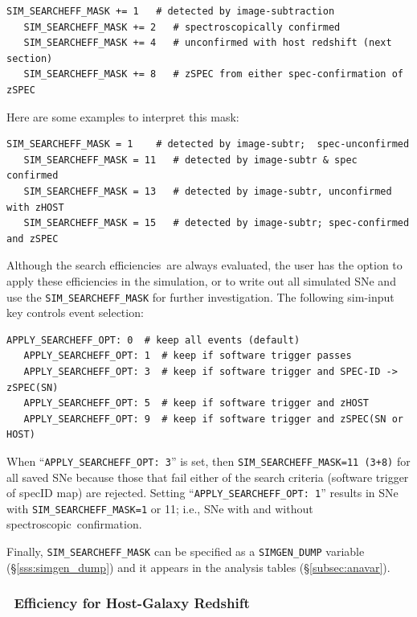 \documentclass[12pt]{article}
\newcommand{\effs}{efficiencies}
\newcommand{\spec}{spectroscopic}
\begin{document}
{%
\begin{Verbatim}[frame=single]
   SIM_SEARCHEFF_MASK += 1   # detected by image-subtraction
   SIM_SEARCHEFF_MASK += 2   # spectroscopically confirmed
   SIM_SEARCHEFF_MASK += 4   # unconfirmed with host redshift (next section)
   SIM_SEARCHEFF_MASK += 8   # zSPEC from either spec-confirmation of zSPEC
\end{Verbatim}
%
Here are some examples to interpret this mask:
%
\begin{Verbatim}[frame=single]
   SIM_SEARCHEFF_MASK = 1    # detected by image-subtr;  spec-unconfirmed
   SIM_SEARCHEFF_MASK = 11   # detected by image-subtr & spec confirmed
   SIM_SEARCHEFF_MASK = 13   # detected by image-subtr, unconfirmed with zHOST
   SIM_SEARCHEFF_MASK = 15   # detected by image-subtr; spec-confirmed and zSPEC
\end{Verbatim}
%
Although the search \effs\ are always evaluated, the user has
the option to apply these efficiencies in the simulation,
or to write out all simulated SNe and use the 
{\tt SIM\_SEARCHEFF\_MASK} for further investigation.
The following sim-input key controls event selection:
%
\begin{Verbatim}[frame=single]
   APPLY_SEARCHEFF_OPT: 0  # keep all events (default)
   APPLY_SEARCHEFF_OPT: 1  # keep if software trigger passes
   APPLY_SEARCHEFF_OPT: 3  # keep if software trigger and SPEC-ID -> zSPEC(SN)
   APPLY_SEARCHEFF_OPT: 5  # keep if software trigger and zHOST
   APPLY_SEARCHEFF_OPT: 9  # keep if software trigger and zSPEC(SN or HOST)
\end{Verbatim}
%
When ``{\tt APPLY\_SEARCHEFF\_OPT: 3}'' is set,
then {\tt SIM\_SEARCHEFF\_MASK=11 (3+8)} for all saved SNe
because those that fail either of the search 
criteria (software trigger of specID map) are rejected. 
Setting  ``{\tt APPLY\_SEARCHEFF\_OPT: 1}'' results
in SNe with {\tt SIM\_SEARCHEFF\_MASK=1} or 11;
i.e., SNe with and without \spec\ confirmation.


Finally, {\tt SIM\_SEARCHEFF\_MASK} can be specified 
as a {\tt SIMGEN\_DUMP} variable (\S\ref{sss:simgen_dump}) 
and it appears in the analysis tables (\S\ref{subsec:anavar}).

\clearpage
\subsubsection{\Nospec\ Efficiency for Host-Galaxy Redshift }
\label{sss:eff_zHOST}

}
\end{document}
